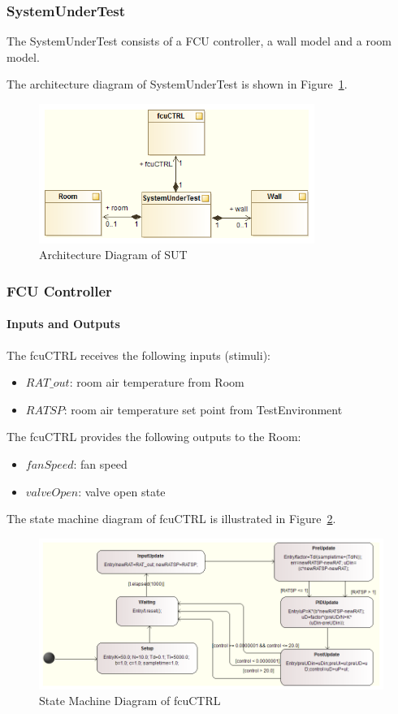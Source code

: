 \subsubsection{SystemUnderTest}
The SystemUnderTest consists of a FCU controller, a wall model and a room model.

The architecture diagram of SystemUnderTest is shown in Figure~\ref{fig:fcu_sut_sad}. 
\begin{figure}[htb!]
    \centering
	\includegraphics[width=0.8\textwidth]{roomwall/fcu_sut_sad}
    \caption{Architecture Diagram of SUT}
    \label{fig:fcu_sut_sad}
\end{figure}

\subsubsection{FCU Controller}
\paragraph{Inputs and Outputs}
The fcuCTRL receives the following inputs (stimuli):
\begin{itemize}
    \item $RAT\_out$: room air temperature from Room
    \item $RATSP$: room air temperature set point from TestEnvironment
\end{itemize}

The fcuCTRL provides the following outputs to the Room:
\begin{itemize}
    \item $fanSpeed$: fan speed 
    \item $valveOpen$: valve open state
\end{itemize}

The state machine diagram of fcuCTRL is illustrated in Figure~\ref{fig:fcu_sut_fcuctrl_sm}.
\begin{figure}[htb!]
    \centering
	\includegraphics[width=1.0\textwidth]{roomwall/fcu_sut_fcuctrl_sm}
    \caption{State Machine Diagram of fcuCTRL}
    \label{fig:fcu_sut_fcuctrl_sm}
\end{figure}

